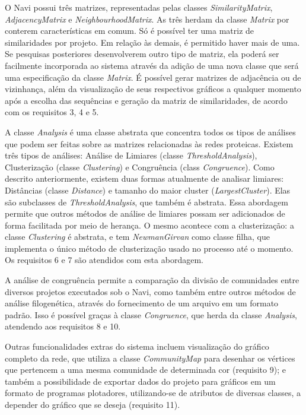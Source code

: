 O Navi possui três matrizes, representadas pelas classes \textit{SimilarityMatrix}, \textit{AdjacencyMatrix} e \textit{NeighbourhoodMatrix}. As três herdam
da classe \textit{Matrix} por conterem características em comum. Só é possível ter uma matriz de similaridades por projeto. Em relação às demais, é permitido
haver mais de uma. Se pesquisas posteriores desenvolverem outro tipo de matriz, ela poderá ser facilmente incorporada ao sistema através da adição de uma
nova classe que será uma especificação da classe \textit{Matrix}. É possível gerar matrizes de adjacência ou de vizinhança, além da visualização de seus
respectivos gráficos a qualquer momento após a escolha das sequências e geração da matriz de similaridades, de acordo com os requisitos 3, 4 e 5.

A classe \textit{Analysis} é uma classe abstrata que concentra todos os tipos de análises que podem ser feitas sobre as matrizes relacionadas às redes
proteicas. Existem três tipos de análises: Análise de Limiares (classe \textit{ThresholdAnalysis}), Clusterização (classe \textit{Clustering}) e
Congruência (class \textit{Congruence}). Como descrito anteriormente, existem duas formas atualmente de analisar limiares: Distâncias (classe
\textit{Distance}) e tamanho do maior cluster (\textit{LargestCluster}). Elas são subclasses de \textit{ThresholdAnalysis}, que também é abstrata. Essa
abordagem permite que outros métodos de análise de limiares possam ser adicionados de forma facilitada por meio de herança. O mesmo acontece com a
clusterização: a classe \textit{Clustering} é abstrata, e tem \textit{NewmanGirvan} como classe filha, que implementa o único método de clusterização
usado no processo até o momento. Os requisitos 6 e 7 são atendidos com esta abordagem.

A análise de congruência permite a comparação da divisão de comunidades entre diversos projetos executados sob o Navi, como também entre outros métodos de
análise filogenética, através do fornecimento de um arquivo em um formato padrão. Isso é possível graças à classe \textit{Congruence}, que herda da classe
\textit{Analysis}, atendendo aos requisitos 8 e 10.

Outras funcionalidades extras do sistema incluem visualização do gráfico completo da rede, que utiliza a classe \textit{CommunityMap} para desenhar
os vértices que pertencem a uma mesma comunidade de determinada cor (requisito 9); e também a possibilidade de exportar dados do projeto para
gráficos em um formato de programas plotadores, utilizando-se de atributos de diversas classes, a depender do gráfico que se deseja (requisito 11).

